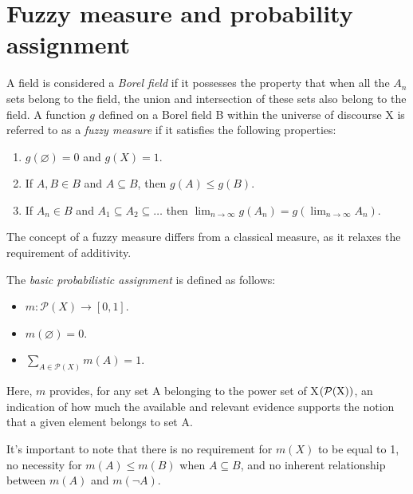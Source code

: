 \section{Fuzzy measure and probability assignment}

\begin{definition}
    A field is considered a \emph{Borel field} if it possesses the property that when all the $A_n$ sets belong to the field, the union and intersection of these sets also belong to the field. 
    A function $g$ defined on a Borel field B within the universe of discourse X is referred to as a \emph{fuzzy measure} if it satisfies the following properties:
    \begin{enumerate}
        \item $g(\varnothing)=0$ and $g(X)=1$.
        \item If $A,B \in B$ and $A \subseteq B$, then $g(A) \leq g(B)$.
        \item If $A_n \in B$ and $A_1 \subseteq A_2 \subseteq \dots$ then $\lim_{n \to \infty}g(A_n)=g\left(\lim_{n \to \infty}A_n\right)$.
    \end{enumerate}
\end{definition}
The concept of a fuzzy measure differs from a classical measure, as it relaxes the requirement of additivity.
\begin{definition}
    The \emph{basic probabilistic assignment} is defined as follows:
    \begin{itemize}
        \item $m:\mathcal{P}(X) \rightarrow [0,1]$.
        \item $m(\varnothing)=0$.
        \item $\sum_{A \in \mathcal{P}(X)}m(A)=1$.
    \end{itemize}
    Here, $m$ provides, for any set A belonging to the power set of X$(\mathcal{P}(\textnormal{X}))$, an indication of how much the available and relevant evidence supports the notion that a given element belongs to set A.
\end{definition}
It's important to note that there is no requirement for $m(X)$ to be equal to 1, no necessity for $m(A) \leq m(B)$ when $A\subseteq B$, and no inherent relationship between $m(A)$ and $m(\lnot A)$.